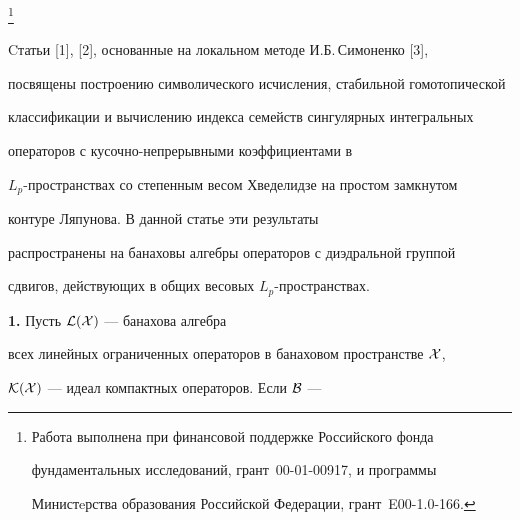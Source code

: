 \thanks{Работа выполнена при финансовой поддержке Российского фонда


фундаментальных исследований, грант \No\,00-01-00917, и программы


Министeрства образования Российской Федерации, грант \No\,E00-1.0-166.}





\date{}




\pagestyle{plain} %







\maketitle


\label{begin}











Cтатьи [1], [2], основанные на локальном методе И.Б.\,Симоненко [3],


посвящены построению символического исчисления, стабильной гомотопической


классификации и вычислению индекса семейств сингулярных интегральных


операторов с кусочно-непрерывными коэффициентами в


$L_p$-пространствах со степенным весом Хведелидзе на простом замкнутом


контуре Ляпунова. В данной статье эти результаты


распространены на банаховы алгебры операторов с диэдральной группой


сдвигов, действующих в общих весовых $L_p$-пространствах.


\medskip





{\bf 1.} Пусть ${\cal L}({\cal X})$ --- банахова алгебра


всех линейных ограниченных операторов в банаховом пространстве ${\cal X}$,


${\cal K}({\cal X})$ --- идеал компактных операторов. Если ${\cal B}$ ---


